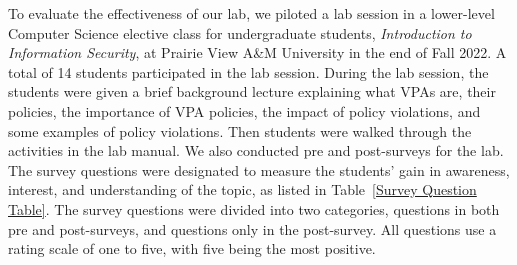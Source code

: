 \documentclass{article}
\begin{document}
To evaluate the effectiveness of our lab, we piloted a lab session in a lower-level Computer Science elective class for undergraduate students, \textit{Introduction to Information Security}, at Prairie View A\&M University in the end of Fall 2022. A total of 14 students participated in the lab session. During the lab session, the students were given a brief background lecture explaining what VPAs are, their policies, the importance of VPA policies, the impact of policy violations, and some examples of policy violations. Then students were walked through the activities in the lab manual. We also conducted pre and post-surveys for the lab. The survey questions were designated to measure the students' gain in awareness, interest, and understanding of the topic, as listed in Table~\ref{Survey Question Table}. The survey questions were divided into two categories, questions in both pre and post-surveys, and questions only in the post-survey. All questions use a rating scale of one to five, with five being the most positive.
\end{document}
